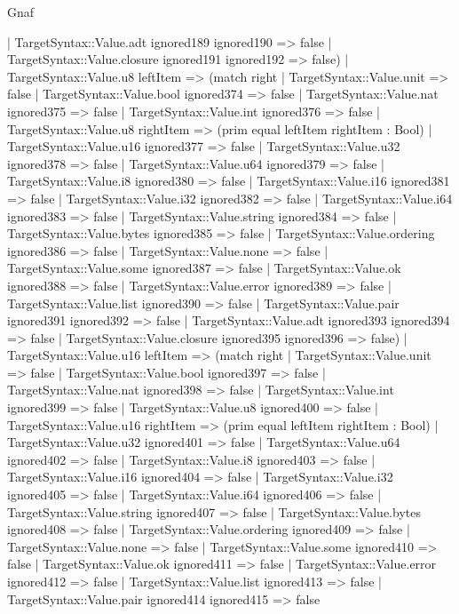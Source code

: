 \begin{lexlean}{Gnaf}
\begin{semanticmodule}
{      | TargetSyntax::Value.adt ignored189 ignored190 => false
      | TargetSyntax::Value.closure ignored191 ignored192 => false)
    | TargetSyntax::Value.u8 leftItem => (match right
      | TargetSyntax::Value.unit => false
      | TargetSyntax::Value.bool ignored374 => false
      | TargetSyntax::Value.nat ignored375 => false
      | TargetSyntax::Value.int ignored376 => false
      | TargetSyntax::Value.u8 rightItem => (prim equal leftItem rightItem : Bool)
      | TargetSyntax::Value.u16 ignored377 => false
      | TargetSyntax::Value.u32 ignored378 => false
      | TargetSyntax::Value.u64 ignored379 => false
      | TargetSyntax::Value.i8 ignored380 => false
      | TargetSyntax::Value.i16 ignored381 => false
      | TargetSyntax::Value.i32 ignored382 => false
      | TargetSyntax::Value.i64 ignored383 => false
      | TargetSyntax::Value.string ignored384 => false
      | TargetSyntax::Value.bytes ignored385 => false
      | TargetSyntax::Value.ordering ignored386 => false
      | TargetSyntax::Value.none => false
      | TargetSyntax::Value.some ignored387 => false
      | TargetSyntax::Value.ok ignored388 => false
      | TargetSyntax::Value.error ignored389 => false
      | TargetSyntax::Value.list ignored390 => false
      | TargetSyntax::Value.pair ignored391 ignored392 => false
      | TargetSyntax::Value.adt ignored393 ignored394 => false
      | TargetSyntax::Value.closure ignored395 ignored396 => false)
    | TargetSyntax::Value.u16 leftItem => (match right
      | TargetSyntax::Value.unit => false
      | TargetSyntax::Value.bool ignored397 => false
      | TargetSyntax::Value.nat ignored398 => false
      | TargetSyntax::Value.int ignored399 => false
      | TargetSyntax::Value.u8 ignored400 => false
      | TargetSyntax::Value.u16 rightItem => (prim equal leftItem rightItem : Bool)
      | TargetSyntax::Value.u32 ignored401 => false
      | TargetSyntax::Value.u64 ignored402 => false
      | TargetSyntax::Value.i8 ignored403 => false
      | TargetSyntax::Value.i16 ignored404 => false
      | TargetSyntax::Value.i32 ignored405 => false
      | TargetSyntax::Value.i64 ignored406 => false
      | TargetSyntax::Value.string ignored407 => false
      | TargetSyntax::Value.bytes ignored408 => false
      | TargetSyntax::Value.ordering ignored409 => false
      | TargetSyntax::Value.none => false
      | TargetSyntax::Value.some ignored410 => false
      | TargetSyntax::Value.ok ignored411 => false
      | TargetSyntax::Value.error ignored412 => false
      | TargetSyntax::Value.list ignored413 => false
      | TargetSyntax::Value.pair ignored414 ignored415 => false
}
\end{semanticmodule}
\end{lexlean}
